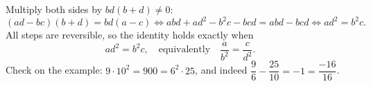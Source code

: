 Multiply both sides by \(bd(b+d)\neq 0\):
\[
(ad-bc)(b+d)=bd(a-c)\iff abd+ad^2-b^2c-bcd=abd-bcd\iff ad^2=b^2c .
\]
All steps are reversible, so the identity holds exactly when
\[
\boxed{ad^2=b^2c},\quad\text{equivalently}\quad \dfrac{a}{b^2}=\dfrac{c}{d^2}.
\]
Check on the example: \(9\cdot 10^2=900=6^2\cdot 25\), and indeed \(\dfrac{9}{6}-\dfrac{25}{10}=-1=\dfrac{-16}{16}\).
